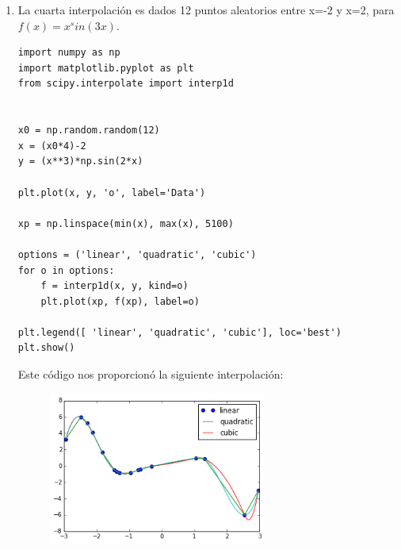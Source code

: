 \documentclass[12pt]{article}
\begin{document}
\begin{enumerate}
\item La cuarta interpolación es dados 12 puntos aleatorios entre x=-2 y x=2, para $f(x)=x^ sin(3x)$.

\begin{verbatim}
import numpy as np
import matplotlib.pyplot as plt
from scipy.interpolate import interp1d


x0 = np.random.random(12)
x = (x0*4)-2
y = (x**3)*np.sin(2*x)

plt.plot(x, y, 'o', label='Data')

xp = np.linspace(min(x), max(x), 5100)
                  
options = ('linear', 'quadratic', 'cubic')
for o in options:
    f = interp1d(x, y, kind=o)    
    plt.plot(xp, f(xp), label=o)    
    
plt.legend([ 'linear', 'quadratic', 'cubic'], loc='best')
plt.show()
\end{verbatim}
 Este código nos proporcionó la siguiente interpolación:
 \begin{figure}[H]
\centering
\includegraphics[height=5cm]{sinxxx.png}
\end{figure}

\end{enumerate}
\end{document}
